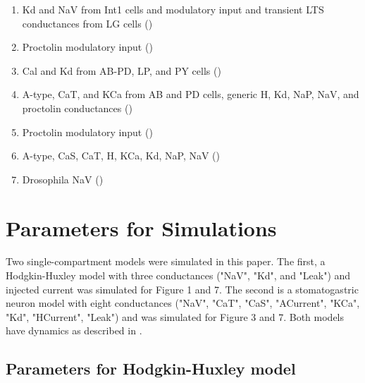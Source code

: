 \documentclass[utf8]{frontiers_suppmat} %
\begin{document}
\begin{enumerate}
		\item Kd and NaV from Int1 cells and modulatory input and transient LTS conductances from LG cells (\cite{rodriguezConvergentRhythmGeneration2013})
		\item Proctolin modulatory input (\cite{sharpDynamicClampComputergenerated1993})
		\item Cal and Kd from AB-PD, LP, and PY cells (\cite{soto-trevinoActivitydependentModificationInhibitory2001})
		\item A-type, CaT, and KCa from AB and PD cells, generic H, Kd, NaP, NaV, and proctolin conductances (\cite{soto-trevinoComputationalModelElectrically2005})
		\item Proctolin modulatory input (\cite{swensenModulatorsConvergentCellular2001})
		\item A-type, CaS, CaT, H, KCa, Kd, NaP, NaV (\cite{turrigianoSelectiveRegulationCurrent1995})
		\item Drosophila NaV (\cite{wicherNonsynapticIonChannels2001})
	\end{enumerate}

\section{Parameters for Simulations}

	Two single-compartment models were simulated in this paper. The first, a Hodgkin-Huxley model with three conductances ("NaV", "Kd", and "Leak") and injected current was simulated for Figure 1 and 7. The second is a stomatogastric neuron model with eight conductances ("NaV", "CaT", "CaS", "ACurrent", "KCa", "Kd", "HCurrent", "Leak") and was simulated for Figure 3 and 7. Both models have dynamics as described in \cite{liuModelNeuronActivityDependent1998}.
	
	\subsection{Parameters for Hodgkin-Huxley model} 
	
\end{document}
